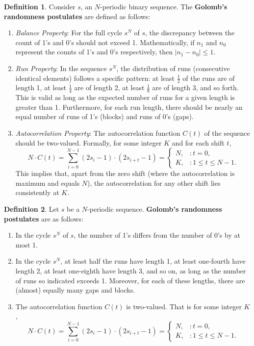 \documentclass[12pt,openany]{book}
\theoremstyle{definition}
\newtheorem{definition}{Definition}[chapter]
\begin{document}
\begin{definition}
	Consider \( s \), an \( N \)-periodic binary sequence. The \textbf{Golomb's randomness postulates} are defined as follows:
	\begin{enumerate}[\textbf{R}1]
		\item \textit{Balance Property}: For the full cycle \( s^N \) of \( s \), the discrepancy between the count of 1's and 0's should not exceed 1. Mathematically, if \( n_1 \) and \( n_0 \) represent the counts of 1's and 0's respectively, then \( |n_1 - n_0| \leq 1 \).
		\item \textit{Run Property}: In the sequence \( s^N \), the distribution of runs (consecutive identical elements) follows a specific pattern: at least \( \frac{1}{2} \) of the runs are of length 1, at least \( \frac{1}{4} \) are of length 2, at least \( \frac{1}{8} \) are of length 3, and so forth. This is valid as long as the expected number of runs for a given length is greater than 1. Furthermore, for each run length, there should be nearly an equal number of runs of 1's (blocks) and runs of 0's (gaps).
		\item \textit{Autocorrelation Property}: The autocorrelation function \( C(t) \) of the sequence should be two-valued. Formally, for some integer \( K \) and for each shift \( t \), 
		\[
		N \cdot C(t) = \sum_{i=0}^{N-1}(2s_i - 1) \cdot (2s_{i+t} - 1)=
		\begin{cases} 
			N, & : t = 0, \\
			K, & : 1 \leq t \leq N - 1.
		\end{cases}
		\]
		This implies that, apart from the zero shift (where the autocorrelation is maximum and equals \( N \)), the autocorrelation for any other shift lies consistently at \( K \).
	\end{enumerate}
\end{definition}

\begin{definition}
	Let \( s \) be a $N$-periodic sequence. \textbf{Golomb's randomness postulates} are as follows:
	\begin{enumerate}[\textbf{R}1]
		\item In the cycle \( s^N \) of \( s \), the number of 1’s differs from the number of 0’s by at most 1.
		\item In the cycle \( s^N \), at least half the runs have length 1, at least one-fourth have length 2, at least one-eighth have length 3, and so on, as long as the number of runs so indicated exceeds 1. Moreover, for each of these lengths, there are (almost) equally many gaps and blocks.
		\item The autocorrelation function \( C(t) \) is two-valued. That is for some integer \( K \),
		\[
		N \cdot C(t) = \sum_{i=0}^{N-1}(2s_i - 1) \cdot (2s_{i+t} - 1)=
		\begin{cases} 
			N, & : t = 0, \\
			K, & : 1 \leq t \leq N - 1.
		\end{cases}
		\]
	\end{enumerate}
\end{definition}
\end{document}
